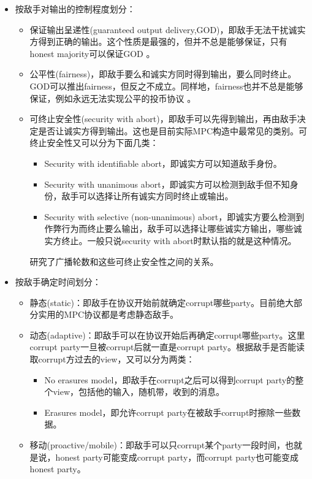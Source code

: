 \documentclass[UTF8]{ctexart}
\theoremstyle{nonumberplain}
\theoremstyle{plain}
\begin{document}
\begin{itemize}
\begin{itemize}
\end{itemize}
\item 按敌手对输出的控制程度划分：
\begin{itemize}
\item 保证输出呈递性(guaranteed output delivery,GOD)，即敌手无法干扰诚实方得到正确的输出。这个性质是最强的，但并不总是能够保证，只有honest majority可以保证GOD \cite{DBLP:conf/crypto/GoyalSZ20}。
\item 公平性(fairness)，即敌手要么和诚实方同时得到输出，要么同时终止。GOD可以推出fairness，但反之不成立。同样地，fairness也并不总是能够保证，例如永远无法实现公平的投币协议 \cite{DBLP:conf/stoc/Cleve86}。
\item 可终止安全性(security with abort)，即敌手可以先得到输出，再由敌手决定是否让诚实方得到输出。这也是目前实际MPC构造中最常见的类别。可终止安全性又可以分为下面几类：
\begin{itemize}
\item Security with identifiable abort，即诚实方可以知道敌手身份。
\item Security with unanimous abort，即诚实方可以检测到敌手但不知身份，敌手可以选择让所有诚实方同时终止或输出。
\item Security with selective (non-unanimous) abort，即诚实方要么检测到作弊行为而终止要么输出，敌手可以选择让哪些诚实方输出，哪些诚实方终止。一般只说security with abort时默认指的就是这种情况。
\end{itemize}
\cite{DBLP:conf/eurocrypt/CohenGZ20}研究了广播轮数和这些可终止安全性之间的关系。
\end{itemize}
\item 按敌手确定时间划分：
\begin{itemize}
\item 静态(static)：即敌手在协议开始前就确定corrupt哪些party。目前绝大部分实用的MPC协议都是考虑静态敌手。
\item 动态(adaptive)：即敌手可以在协议开始后再确定corrupt哪些party。这里corrupt party一旦被corrupt后就一直是corrupt party。根据敌手是否能读取corrupt方过去的view，又可以分为两类：
\begin{itemize}
\item No erasures model，即敌手在corrupt之后可以得到corrupt party的整个view，包括他的输入，随机带，收到的消息。\cite{DBLP:conf/stoc/CanettiFGN96,DBLP:journals/joc/Canetti00,DBLP:conf/stoc/CanettiLOS02}
\item Erasures model，即允许corrupt party在被敌手corrupt时擦除一些数据。\cite{DBLP:conf/eurocrypt/BeaverH92,DBLP:conf/ctrsa/Lindell09a}
\end{itemize}
\item 移动(proactive/mobile)：即敌手可以只corrupt某个party一段时间，也就是说，honest party可能变成corrupt party，而corrupt party也可能变成honest party。\cite{DBLP:conf/podc/OstrovskyY91,DBLP:conf/crypto/CanettiH94}
\end{itemize}
\end{itemize}
\end{document}
